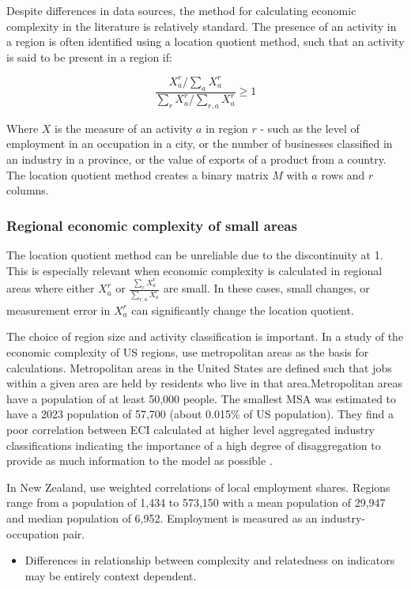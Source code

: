 \documentclass[
  number]{elsarticle}
\providecommand{\tightlist}{%
  \setlength{\itemsep}{0pt}\setlength{\parskip}{0pt}}\usepackage{longtable,booktabs,array}
\begin{document}
Despite differences in data sources, the method for calculating economic
complexity in the literature is relatively standard. The presence of an
activity in a region is often identified using a location quotient
method, such that an activity is said to be present in a region if:

\[\frac{X_a^r/\sum_{a}X_a^r}{\sum_{r}X_a^r/\sum_{r,a}X_a^r} \geq 1\]

Where \(X\) is the measure of an activity \(a\) in region \(r\) - such
as the level of employment in an occupation in a city, or the number of
businesses classified in an industry in a province, or the value of
exports of a product from a country. The location quotient method
creates a binary matrix \(M\) with \(a\) rows and \(r\) columns.

\subsubsection{Regional economic complexity of small
areas}\label{regional-economic-complexity-of-small-areas}

The location quotient method can be unreliable due to the discontinuity
at 1. This is especially relevant when economic complexity is calculated
in regional areas where either \(X_a^r\) or
\(\frac{\sum_{r}X_a^r}{\sum_{r,a}X_a^r}\) are small. In these cases,
small changes, or measurement error in \(X_a^r\) can significantly
change the location quotient.

The choice of region size and activity classification is important. In a
study of the economic complexity of US regions, \citep{ecus} use
metropolitan areas as the basis for calculations. Metropolitan areas in
the United States are defined such that jobs within a given area are
held by residents who live in that area.Metropolitan areas have a
population of at least 50,000 people. The smallest MSA was estimated to
have a 2023 population of 57,700 (about 0.015\% of US population). They
find a poor correlation between ECI calculated at higher level
aggregated industry classifications indicating the importance of a high
degree of disaggregation to provide as much information to the model as
possible \citep{ecus}.

In New Zealand, \citep{ecnz} use weighted correlations of local
employment shares. Regions range from a population of 1,434 to 573,150
with a mean population of 29,947 and median population of 6,952.
Employment is measured as an industry-occupation pair.

\begin{itemize}
\tightlist
\item
  Differences in relationship between complexity and relatedness on
  indicators may be entirely context dependent.
\end{itemize}
\end{document}
